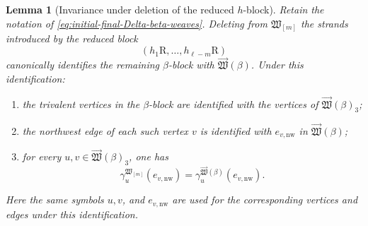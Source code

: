 \documentclass[12pt, reqno]{amsart}
\theoremstyle{plain}
\newtheorem{lemma}[theorem]{Lemma}
\theoremstyle{definition}
\numberwithin{equation}{section}
\begin{document}
\begin{lemma}[Invariance under deletion of the reduced \(h\)-block]
\label{lem:Lusztig-cycle-h-block-invariance}
Retain the notation of
\eqref{eq:initial-final-Delta-beta-weaves}. Deleting from \(\mathfrak W_{[m]}\) the strands introduced by the
reduced block
\[
    (h_1\mathrm R,\ldots,h_{\ell-m}\mathrm R)
\]
canonically identifies the remaining \(\beta\)-block with
\(\overrightarrow{\mathfrak W}(\beta)\). Under this identification:

\begin{enumerate}
\item the trivalent vertices in the \(\beta\)-block are identified
with the vertices of
\(\overrightarrow{\mathfrak W}(\beta)_3\);

\item the northwest edge of each such vertex \(v\) is identified with
\(e_{v,\mathrm{nw}}\) in
\(\overrightarrow{\mathfrak W}(\beta)\);

\item for every
\(u,v\in\overrightarrow{\mathfrak W}(\beta)_3\), one has
\begin{equation}\label{eq:Lusztig-cycle-h-block-invariance}
    \gamma_u^{\mathfrak W_{[m]}}
        (e_{v,\mathrm{nw}})
    =
    \gamma_u^{\overrightarrow{\mathfrak W}(\beta)}
        (e_{v,\mathrm{nw}}).
\end{equation}
\end{enumerate}
Here the same symbols \(u,v\), and \(e_{v,\mathrm{nw}}\) are used for
the corresponding vertices and edges under this identification.
\end{lemma}
\end{document}
